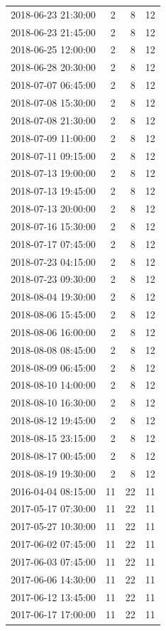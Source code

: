 \begin{tabular}{lrrr}
2018-06-23 21:30:00 & 2 & 8 & 12 \\
2018-06-23 21:45:00 & 2 & 8 & 12 \\
2018-06-25 12:00:00 & 2 & 8 & 12 \\
2018-06-28 20:30:00 & 2 & 8 & 12 \\
2018-07-07 06:45:00 & 2 & 8 & 12 \\
2018-07-08 15:30:00 & 2 & 8 & 12 \\
2018-07-08 21:30:00 & 2 & 8 & 12 \\
2018-07-09 11:00:00 & 2 & 8 & 12 \\
2018-07-11 09:15:00 & 2 & 8 & 12 \\
2018-07-13 19:00:00 & 2 & 8 & 12 \\
2018-07-13 19:45:00 & 2 & 8 & 12 \\
2018-07-13 20:00:00 & 2 & 8 & 12 \\
2018-07-16 15:30:00 & 2 & 8 & 12 \\
2018-07-17 07:45:00 & 2 & 8 & 12 \\
2018-07-23 04:15:00 & 2 & 8 & 12 \\
2018-07-23 09:30:00 & 2 & 8 & 12 \\
2018-08-04 19:30:00 & 2 & 8 & 12 \\
2018-08-06 15:45:00 & 2 & 8 & 12 \\
2018-08-06 16:00:00 & 2 & 8 & 12 \\
2018-08-08 08:45:00 & 2 & 8 & 12 \\
2018-08-09 06:45:00 & 2 & 8 & 12 \\
2018-08-10 14:00:00 & 2 & 8 & 12 \\
2018-08-10 16:30:00 & 2 & 8 & 12 \\
2018-08-12 19:45:00 & 2 & 8 & 12 \\
2018-08-15 23:15:00 & 2 & 8 & 12 \\
2018-08-17 00:45:00 & 2 & 8 & 12 \\
2018-08-19 19:30:00 & 2 & 8 & 12 \\
2016-04-04 08:15:00 & 11 & 22 & 11 \\
2017-05-17 07:30:00 & 11 & 22 & 11 \\
2017-05-27 10:30:00 & 11 & 22 & 11 \\
2017-06-02 07:45:00 & 11 & 22 & 11 \\
2017-06-03 07:45:00 & 11 & 22 & 11 \\
2017-06-06 14:30:00 & 11 & 22 & 11 \\
2017-06-12 13:45:00 & 11 & 22 & 11 \\
2017-06-17 17:00:00 & 11 & 22 & 11 \\

\end{tabular}
